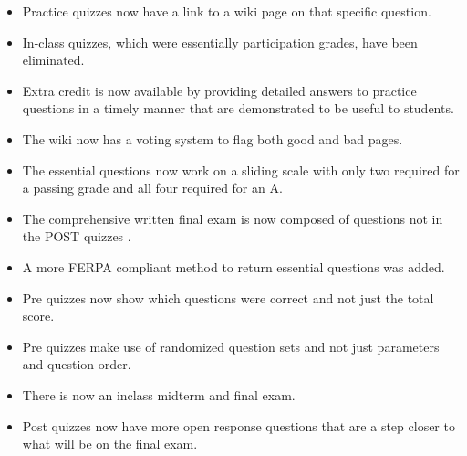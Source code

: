 \documentclass[letterpaper,10pt]{article}
\begin{document}
\begin{itemize}
    \item Practice quizzes now have a link to a wiki page on that specific question.
     \item In-class quizzes, which were essentially participation grades, have been eliminated.
     \item Extra credit is now available by providing detailed answers to practice questions in a timely manner that are demonstrated to be useful to students.
    \item The wiki now has a voting system to flag both good and bad pages.
     \item The essential questions now work on a sliding scale with only two required for a passing grade and all four required for an A.
    \item The comprehensive written final exam is now composed of questions not in the POST quizzes .
     \item A more FERPA compliant method to return essential questions was added.
    \item Pre quizzes now show which questions were correct and not just the total score.
    \item Pre quizzes make use of randomized question sets and not just parameters and question order.
    \item There is now an inclass midterm and final exam.
    \item Post quizzes now have more open response questions that are a step closer to what will be on the final exam.
\end{itemize}
\end{document}
